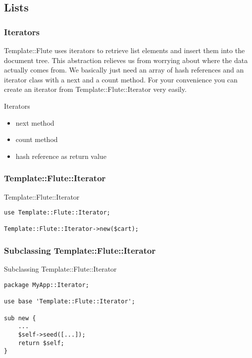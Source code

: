 \subsection{Lists}

\subsubsection{Iterators}
Template::Flute uses iterators to retrieve list elements and insert them into
the document tree. This abstraction relieves us from worrying about where
the data actually comes from. We basically just need an array of hash
references and an iterator class with a next and a count method. For your
convenience you can create an iterator from Template::Flute::Iterator
very easily.

\begin{frame}{Iterators}
\begin{itemize}
  \item next method
  \item count method
  \item hash reference as return value
 \end{itemize}
\end{frame}

\subsubsection{Template::Flute::Iterator}
\begin{frame}[fragile]{Template::Flute::Iterator}
\begin{lstlisting}
use Template::Flute::Iterator;

Template::Flute::Iterator->new($cart);
\end{lstlisting}
\end{frame}

\subsubsection{Subclassing Template::Flute::Iterator}
\begin{frame}[fragile]{Subclassing Template::Flute::Iterator}
\begin{lstlisting}
package MyApp::Iterator;

use base 'Template::Flute::Iterator';

sub new {
    ...
    $self->seed([...]);
    return $self;
}
\end{lstlisting}
\end{frame}


